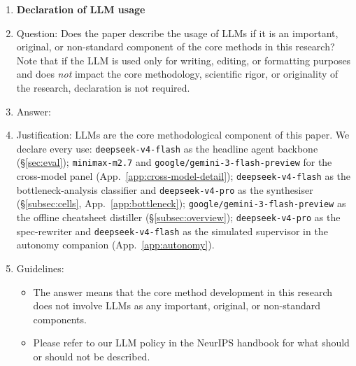 \begin{enumerate}
\item {\bf Declaration of LLM usage}
    \item[] Question: Does the paper describe the usage of LLMs if it is an important, original, or non-standard component of the core methods in this research? Note that if the LLM is used only for writing, editing, or formatting purposes and does \emph{not} impact the core methodology, scientific rigor, or originality of the research, declaration is not required.
    \item[] Answer: \answerYes{}
    \item[] Justification: LLMs are the core methodological component of this paper. We declare every use: \texttt{deepseek-v4-flash} as the headline agent backbone (\S\ref{sec:eval}); \texttt{minimax-m2.7} and \texttt{google/gemini-3-flash-preview} for the cross-model panel (App.~\ref{app:cross-model-detail}); \texttt{deepseek-v4-flash} as the bottleneck-analysis classifier and \texttt{deepseek-v4-pro} as the synthesiser (\S\ref{subsec:cells}, App.~\ref{app:bottleneck}); \texttt{google/gemini-3-flash-preview} as the offline cheatsheet distiller (\S\ref{subsec:overview}); \texttt{deepseek-v4-pro} as the spec-rewriter and \texttt{deepseek-v4-flash} as the simulated supervisor in the autonomy companion (App.~\ref{app:autonomy}).
    \item[] Guidelines:
    \begin{itemize}
        \item The answer \answerNA{} means that the core method development in this research does not involve LLMs as any important, original, or non-standard components.
        \item Please refer to our LLM policy in the NeurIPS handbook for what should or should not be described.
    \end{itemize}

\end{enumerate}
